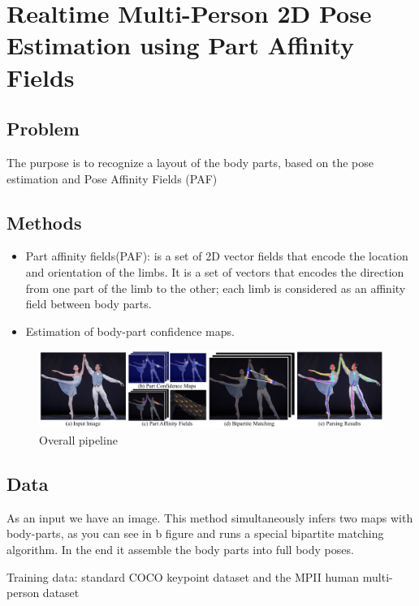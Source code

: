 \documentclass[runningheads,a4paper,11pt]{report}
\begin{document}
\section{Realtime Multi-Person 2D Pose Estimation using Part Affinity Fields
\cite{DBLP:journals/corr/CaoSWS16}}

\subsection{Problem}
\par The purpose is to recognize a layout of the body parts, based on the pose estimation and Pose Affinity Fields (PAF)



\subsection{Methods}
 \begin{itemize}
    \item Part affinity fields(PAF): is a set of 2D vector fields that encode the location and orientation of the limbs. It is a set of vectors that encodes the direction from one part of the limb to the other; each limb is considered as an affinity field between body parts.
    \item Estimation of body-part confidence maps.
 \end{itemize}
\begin{figure}[htbp]
	\centerline{\includegraphics[scale=0.25]{fig/algoritm-ann.png}}  
	\caption{Overall pipeline}
\end{figure}

\subsection{Data}
\par As an input we have an image. This method simultaneously infers two maps with body-parts, as you can see in b figure and runs a special bipartite matching algorithm. In the end it assemble the body parts into full body poses.
\par Training data: standard COCO keypoint dataset \cite{coco2016} and the MPII human multi-person
dataset \cite{database2dhuman}
\end{document}
